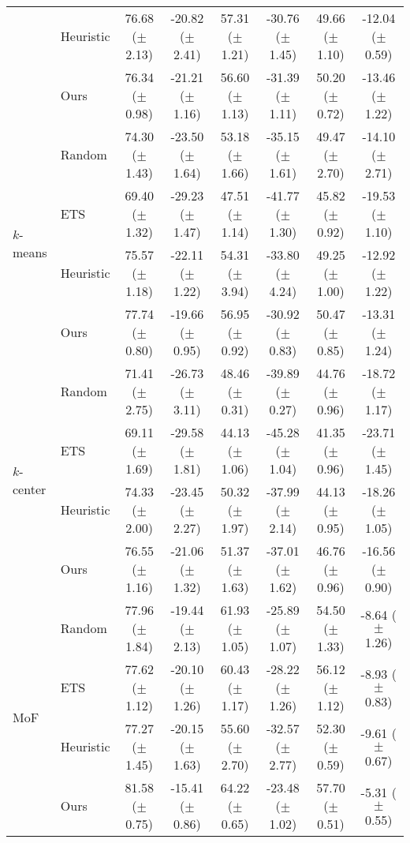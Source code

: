 \begin{table}[t]
{\begin{tabular}{l l c c c c c c}
         & Heuristic & 76.68 ($\pm$ 2.13) & -20.82 ($\pm$ 2.41) & 57.31 ($\pm$ 1.21) & -30.76 ($\pm$ 1.45) & 49.66 ($\pm$ 1.10) & -12.04 ($\pm$ 0.59) \\
         & Ours & 76.34 ($\pm$ 0.98) & -21.21 ($\pm$ 1.16) & 56.60 ($\pm$ 1.13) & -31.39 ($\pm$ 1.11) & 50.20 ($\pm$ 0.72) & -13.46 ($\pm$ 1.22) \\
        \midrule 
        \multirow{4}{*}{$k$-means} & Random & 74.30 ($\pm$ 1.43) & -23.50 ($\pm$ 1.64) & 53.18 ($\pm$ 1.66) & -35.15 ($\pm$ 1.61) & 49.47 ($\pm$ 2.70) & -14.10 ($\pm$ 2.71) \\
         & ETS & 69.40 ($\pm$ 1.32) & -29.23 ($\pm$ 1.47) & 47.51 ($\pm$ 1.14) & -41.77 ($\pm$ 1.30) & 45.82 ($\pm$ 0.92) & -19.53 ($\pm$ 1.10) \\
         & Heuristic & 75.57 ($\pm$ 1.18) & -22.11 ($\pm$ 1.22) & 54.31 ($\pm$ 3.94) & -33.80 ($\pm$ 4.24) & 49.25 ($\pm$ 1.00) & -12.92 ($\pm$ 1.22) \\
         & Ours & 77.74 ($\pm$ 0.80) & -19.66 ($\pm$ 0.95) & 56.95 ($\pm$ 0.92) & -30.92 ($\pm$ 0.83) & 50.47 ($\pm$ 0.85) & -13.31 ($\pm$ 1.24) \\
        \midrule 
        \multirow{4}{*}{$k$-center} & Random & 71.41 ($\pm$ 2.75) & -26.73 ($\pm$ 3.11) & 48.46 ($\pm$ 0.31) & -39.89 ($\pm$ 0.27) & 44.76 ($\pm$ 0.96) & -18.72 ($\pm$ 1.17) \\
         & ETS & 69.11 ($\pm$ 1.69) & -29.58 ($\pm$ 1.81) & 44.13 ($\pm$ 1.06) & -45.28 ($\pm$ 1.04) & 41.35 ($\pm$ 0.96) & -23.71 ($\pm$ 1.45) \\
         & Heuristic & 74.33 ($\pm$ 2.00) & -23.45 ($\pm$ 2.27) & 50.32 ($\pm$ 1.97) & -37.99 ($\pm$ 2.14) & 44.13 ($\pm$ 0.95) & -18.26 ($\pm$ 1.05) \\
         & Ours & 76.55 ($\pm$ 1.16) & -21.06 ($\pm$ 1.32) & 51.37 ($\pm$ 1.63) & -37.01 ($\pm$ 1.62) & 46.76 ($\pm$ 0.96) & -16.56 ($\pm$ 0.90) \\
        \midrule
        \multirow{4}{*}{MoF} & Random & 77.96 ($\pm$ 1.84) & -19.44 ($\pm$ 2.13) & 61.93 ($\pm$ 1.05) & -25.89 ($\pm$ 1.07) & 54.50 ($\pm$ 1.33) & -8.64 ($\pm$ 1.26) \\
         & ETS & 77.62 ($\pm$ 1.12) & -20.10 ($\pm$ 1.26) & 60.43 ($\pm$ 1.17) & -28.22 ($\pm$ 1.26) & 56.12 ($\pm$ 1.12) & -8.93 ($\pm$ 0.83) \\
         & Heuristic & 77.27 ($\pm$ 1.45) & -20.15 ($\pm$ 1.63) & 55.60 ($\pm$ 2.70) & -32.57 ($\pm$ 2.77) & 52.30 ($\pm$ 0.59) & -9.61 ($\pm$ 0.67) \\
         & Ours & 81.58 ($\pm$ 0.75) & -15.41 ($\pm$ 0.86) & 64.22 ($\pm$ 0.65) & -23.48 ($\pm$ 1.02) & 57.70 ($\pm$ 0.51) & -5.31 ($\pm$ 0.55) \\
        \bottomrule
    \end{tabular}
    }
    \vspace{-3mm}
    \label{tab:bwt_alternative_memory_selection}
\end{table}


